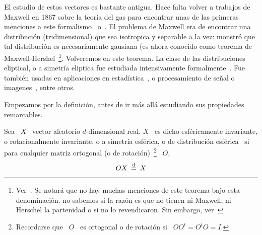 \label{Ssec:MP:FamiliaEliptica}



\label{Ssec:MP:FamiliaElipticaReal}


El estudio de  estos vectores es bastante antigua. Hace  falta volver a trabajos
de Maxwell en 1867  sobre la teoria del gas para encontrar  unas de las primeras
menciones  a este  formalismo~\cite{Max67}  o~\cite[pp.~377--391]{Nie52:v1}.  El
problema de Maxwell era de encontrar una distribuci\'on (tridimensional) que sea
isotropica  y  separable   a  la  vez:  monstr\'o  que   tal  distribuci\'on  es
necesariamente    gausiana    (es     ahora    conocido    como    teorema    de
Maxwell-Hershel~\footnote{Ver~\cite[Prop.~4.11]{BilBre99}.   Se notar\'a  que no
  hay muchas menciones  de este teorema bajo esta  denominaci\'on. no sabemos si
  la raz\'on es que  no tienen ni Maxwell, ni Herschel la  partenidad o si no lo
  revendicaron. Sin embargo, ver~\cite{Max67}}.   Volveremos en este teorema. La
clase de  las distribuciones  eliptical, o a  simetr\'ia eliptica  fue estudiada
intensivamente  formalmente~\cite{Bar34,  Bar34:07,  Ver64, McgWag68,  CamHua81,
  Eat81,  Kan94,  Lau75,  Yao73,   KotNad01,  FanKot90,  Mui82,  BilBre99}.  Fue
tambi\'en  usadas   en  aplicaciones  en   estad\'istica~\cite{BlaTho68,  Chu73,
  YanKot03,  ArePin06,  BauPas07,  ChiPas08},   o  procesamiento  de  se\~nal  o
imagenes~\cite{Gol76, RanWei93, RanWei95, ZozVig10, Zoz12}, entre otros.

Empezamos  por  la  definici\'on,  antes  de  ir  m\'as  all\'a  estudiando  sus
propiedades remarcables.

\begin{definicion}
  Sea  \  $X$  \  vector   aleatorio  $d$-dimensional  real.   $X$  \  es  dicho
  esf\'ericamente  invariante,  o   rotacionalmente  invariante,  o  a  simetr\'ia
  esf\'erica, o de distribuci\'on esf\'erica \ si para cualquier matriz ortogonal (o
  de rotaci\'on)~\footnote{Recordarse que \ $O$  \ es ortogonal o de rotaci\'on
    si \ $O O^t = O^t O = I$.} \ $O$,
  \[
  O  X  \: \stackrel{\mathrm{d}}{=}  \: X
  \]
\end{definicion}

